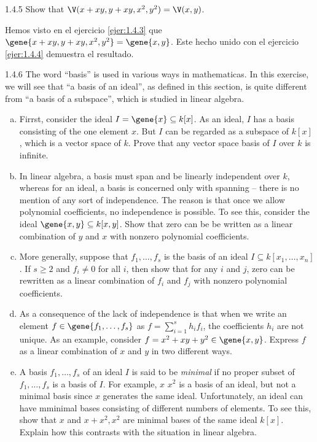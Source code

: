 \documentclass[twoside]{article}
\begin{document}
\newpage

\begin{ejercicio}{1.4.5}
Show that $\V(x+xy,y+xy,x^2,y^2) = \V(x,y)$.
\end{ejercicio}
\begin{solucion}
Hemos visto en el ejercicio \ref{ejer:1.4.3} que $\gene{x+xy,y+xy,x^2,y^2} = \gene{x,y}$.
Este hecho unido con el ejercicio \ref{ejer:1.4.4} demuestra el resultado.
\end{solucion}

\newpage

\begin{ejercicio}{1.4.6}
The word ``basis'' is used in various ways in mathematicas.
In this exercise, we will see that ``a basis of an ideal'', as defined in this section, is quite different from ``a basis of a subspace'', which is studied in linear algebra.
\begin{enumerate}[a.]
\item Firrst, consider the ideal $I = \gene{x} \subseteq k[x]$.
As an ideal, $I$ has a basis consisting of the one element $x$.
But $I$ can be regarded as a subspace of $k[x]$, which is a vector space of $k$.
Prove that any vector space basis of $I$ over $k$ is infinite.
\item In linear algebra, a basis must span and be linearly independent over $k$, whereas for an ideal, a basis is concerned only with spanning -- there is no mention of any sort of independence.
The reason is that once we allow polynomial coefficients, no independence is possible.
To see this, consider the ideal $\gene{x,y} \subseteq k[x,y]$.
Show that zero can be be written as a linear combination of $y$ and $x$ with nonzero polynomial coefficients.
\item More generally, suppose that $f_1,\dots,f_s$ is the basis of an ideal $I \subseteq k[x_1,\dots,x_n]$.
If $s ≥ 2$ and $f_i \neq 0$ for all $i$, then show that for any $i$ and $j$, zero can be rewritten as a linear combination of $f_i$ and $f_j$ with nonzero polynomial coefficients.
\item As a consequence of the lack of independence is that when we write an element $f \in \gene{f_1,\dots,f_s}$ as $f = \sum_{i=1}^s h_i f_i$, the coefficients $h_i$ are not unique.
As an example, consider $f = x^2 + xy + y^2 \in \gene{x,y}$.
Express $f$ as a linear combination of $x$ and $y$ in two different ways.
\item A basis $f_1,\dots,f_s$ of an ideal $I$ is said to be \emph{minimal} if no proper subset of $f_1,\dots,f_s$ is a basis of $I$. For example, $x$ $x^2$ is a basis of an ideal, but not a minimal basis since $x$ generates the same ideal.
Unfortunately, an ideal can have mminimal bases consisting of different numbers of elements.
To see this, show that $x$ and $x+x^2,x^2$ are minimal bases of the same ideal $k[x]$. Explain how this contrasts with the situation in linear algebra.
\end{enumerate}
\end{ejercicio}
\end{document}
